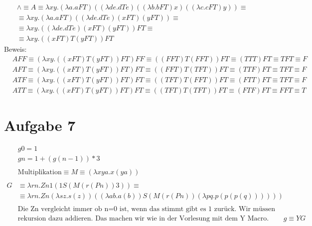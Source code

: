 \documentclass[11]{article}
\begin{document}
\begin{align*}
& \land \equiv A \equiv \lambda xy.(\lambda a.aFT)( (\lambda de.dTe) ((\lambda b.bFT)x) ((\lambda c.cFT)y) ) \equiv \\
& \equiv \lambda xy.(\lambda a.aFT)((\lambda de.dTe) (xFT) (yFT)) \equiv \\
& \equiv \lambda xy.((\lambda de.dTe) (xFT) (yFT))FT \equiv \\
& \equiv \lambda xy.((xFT)T(yFT))FT
\end{align*}
Beweis:
\begin{align*}
& AFF \equiv (\lambda xy.((xFT)T(yFT))FT)FF \equiv ((FFT)T(FFT))FT \equiv (TTT)FT \equiv TFT \equiv F \\
& AFT \equiv (\lambda xy.((xFT)T(yFT))FT)FT \equiv ((FFT)T(TFT))FT \equiv (TTF)FT \equiv TFT \equiv F \\
& ATF \equiv (\lambda xy.((xFT)T(yFT))FT)FT \equiv ((TFT)T(FFT))FT \equiv (FTT)FT \equiv TFT \equiv F \\
& ATT \equiv (\lambda xy.((xFT)T(yFT))FT)FT \equiv ((TFT)T(TFT))FT \equiv (FTF)FT \equiv FFT \equiv T
\end{align*}
%
\section*{Aufgabe 7}
\begin{align*}
& g 0 = 1 \\
& g n = 1+ (g(n-1))*3 \\ \\
& \text{Multiplikation} \equiv M \equiv (\lambda xya.x(ya)) \\ \\
G & \equiv \lambda rn.Zn1(1S (M (r(Pn))3)) \equiv \\
& \equiv \lambda rn.Zn(\lambda sz.s(z))((\lambda ab.a(b))S (M (r(Pn))(\lambda pq.p(p(p(q))) ) )) \\ \\
& \text{Die Zn vergleicht immer ob n=0 ist, wenn das stimmt gibt es 1 zurück. Wir müssen nur noch unsere} \\
& \text{rekursion dazu addieren. Das machen wir wie in der Vorlesung mit dem Y Macro. Damit ist } g \equiv YG
\end{align*}
\end{document}
